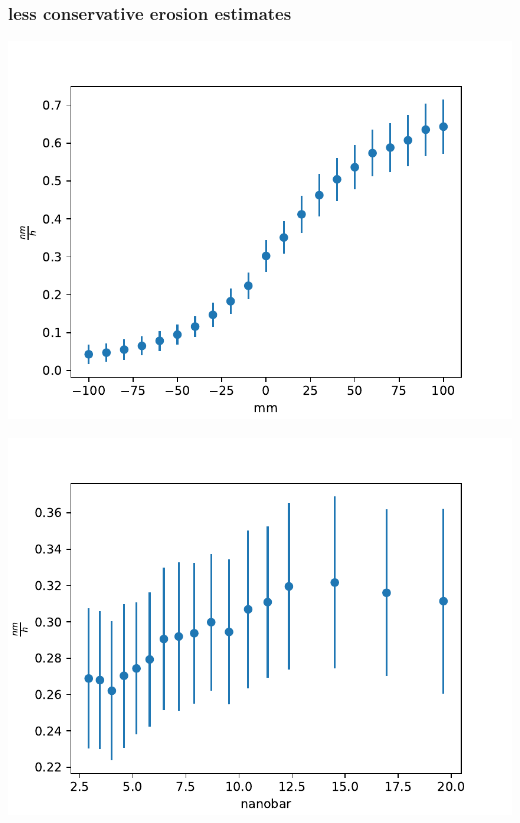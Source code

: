 \documentclass{beamer} %
\begin{document}
\begin{frame}
    \frametitle{less conservative erosion estimates}
    \begin{minipage}{0.49\textwidth}
        \includegraphics[width=1.1\textwidth]{figures/PosVary_H2_2A_sput.pdf}
    \end{minipage}
    \begin{minipage}{0.49\textwidth}
        \includegraphics[width=1.1\textwidth]{figures/Gasvary_H2_2A_sput.pdf}
    \end{minipage}
    \begin{minipage}{0.49\textwidth}

\end{minipage}
\end{frame}
\end{document}
